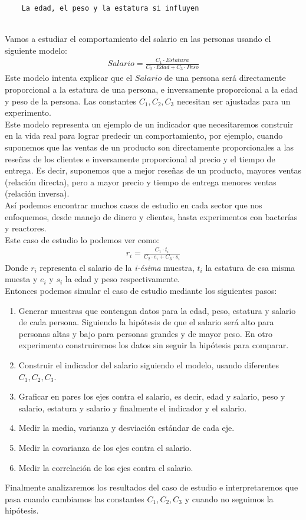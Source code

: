 \documentclass{article}
\begin{document}
\begin{verbatim}
    La edad, el peso y la estatura si influyen
\end{verbatim}
\hfill\\
Vamos a estudiar el comportamiento del salario en las personas usando el siguiente modelo:
\begin{equation}
    \begin{aligned}
        Salario = \frac{C_1 \cdot Estatura}{C_2 \cdot Edad + C_3 \cdot Peso}
    \end{aligned}
\end{equation}
Este modelo intenta explicar que el $Salario$ de una persona será directamente proporcional a la estatura de una persona, e inversamente proporcional a la edad y peso de la persona. Las constantes $C_1, C_2, C_3$ necesitan ser ajustadas para un experimento.
\\[12pt]
Este modelo representa un ejemplo de un indicador que necesitaremos construir en la vida real para lograr predecir un comportamiento, por ejemplo, cuando suponemos que las ventas de un producto son directamente proporcionales a las reseñas de los clientes e inversamente proporcional al precio y el tiempo de entrega. Es decir, suponemos que a mejor reseñas de un producto, mayores ventas (relación directa), pero a mayor precio y tiempo de entrega menores ventas (relación inversa).
\\[12pt]
Así podemos encontrar muchos casos de estudio en cada sector que nos enfoquemos, desde manejo de dinero y clientes, hasta experimentos con bacterías y reactores.
\\[12pt]
Este caso de estudio lo podemos ver como:
\begin{equation}
    \begin{aligned}
        r_i = \frac{C_1 \cdot t_i}{C_2 \cdot e_i + C_3 \cdot s_i}
    \end{aligned}
\end{equation}
Donde $r_i$ representa el salario de la \textit{i-ésima} muestra, $t_i$ la estatura de esa misma muesta y $e_i$ y $s_i$ la edad y peso respectivamente.
\\[12pt]
Entonces podemos simular el caso de estudio mediante los siguientes pasos:
\begin{enumerate}
    \item Generar muestras que contengan datos para la edad, peso, estatura y salario de cada persona. Siguiendo la hipótesis de que el salario será alto para personas altas y bajo para personas grandes y de mayor peso. En otro experimento construiremos los datos sin seguir la hipótesis para comparar.
    \item Construir el indicador del salario siguiendo el modelo, usando diferentes $C_1, C_2, C_3$.
    \item Graficar en pares los ejes contra el salario, es decir, edad y salario, peso y salario, estatura y salario y finalmente el indicador y el salario.
    \item Medir la media, varianza y desviación estándar de cada eje.
    \item Medir la covarianza de los ejes contra el salario.
    \item Medir la correlación de los ejes contra el salario.
\end{enumerate}
Finalmente analizaremos los resultados del caso de estudio e interpretaremos que pasa cuando cambiamos las constantes $C_1, C_2, C_3$ y cuando no seguimos la hipótesis.
\end{document}
